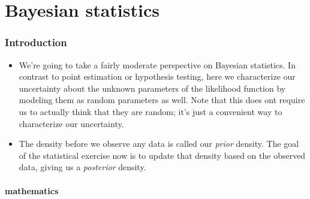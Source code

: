 

\part*{Bayesian statistics}%

\section{Introduction}

\begin{itemize}

\item We're going to take a fairly moderate perspective on Bayesian
  statistics.  In contrast to point estimation or hypothesis testing,
  here we characterize our uncertainty about the unknown parameters of
  the likelihood function by modeling them as random parameters as
  well.  Note that this does ont require us to actually think that
  they are random; it's just a convenient way to characterize our
  uncertainty.

\item The density before we observe any data is called our
  \emph{prior} density.  The goal of the statistical exercise now is
  to update that density based on the observed data, giving us a
  \emph{posterior} density.

\end{itemize}

\subsection{mathematics}

